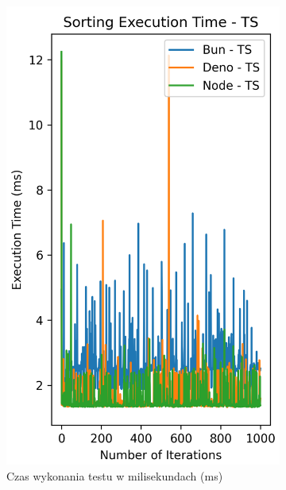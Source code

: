 \begin{figure}[H]
  \centering
  \begin{subfigure}[b]{0.42\textwidth}
    \centering
    \includegraphics[width=\textwidth]{Figures/sorting/sorting_radix_1000_10000_ts_time.png}
    \caption{Czas wykonania testu w milisekundach (ms)}
    \label{fig:radix_sorting_e4_ts_time}
  \end{subfigure}
  \begin{subfigure}[b]{0.42\textwidth}
    \centering

\end{subfigure}
\end{figure}
